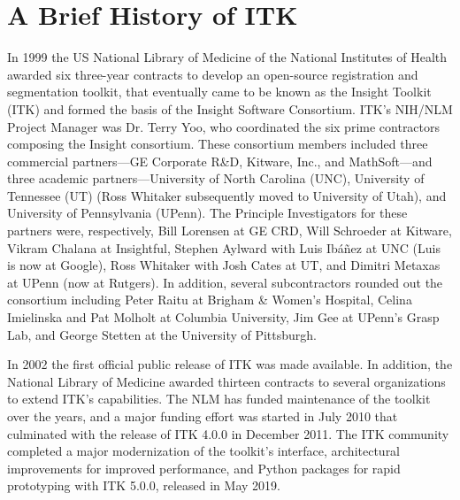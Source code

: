 \section{A Brief History of ITK}%
\label{sec:History}%
In 1999 the US National Library of Medicine of the National Institutes of
Health awarded six three-year contracts to develop an open-source
registration and segmentation toolkit, that eventually came to be known as
the Insight Toolkit (ITK) and formed the basis of the Insight Software
Consortium. ITK's NIH/NLM Project Manager was Dr. Terry Yoo, who coordinated the
six prime contractors composing the Insight consortium. These consortium
members included three commercial partners---GE Corporate R\&D, Kitware,
Inc., and MathSoft---and three academic
partners---University of North Carolina (UNC), University of Tennessee (UT)
(Ross Whitaker subsequently moved to University of Utah), and University of
Pennsylvania (UPenn). The Principle Investigators for these partners were,
respectively, Bill Lorensen at GE CRD, Will Schroeder at Kitware, Vikram
Chalana at Insightful, Stephen Aylward with Luis Ib\'{a}\~{n}ez at UNC (Luis
is now at Google), Ross Whitaker with Josh Cates at UT,
and Dimitri Metaxas at UPenn (now at Rutgers). In addition, several
subcontractors rounded out the consortium including Peter Raitu at Brigham \&
Women's Hospital, Celina Imielinska and Pat Molholt at Columbia University,
Jim Gee at UPenn's Grasp Lab, and George Stetten at the University of
Pittsburgh.

In 2002 the first official public release of ITK was made available. In
addition, the National Library of Medicine awarded thirteen contracts to
several organizations to extend ITK's capabilities. The NLM has funded
maintenance of the toolkit over the years, and a major funding effort was
started in July 2010 that culminated with the release of ITK 4.0.0 in December
2011. The ITK community completed a major modernization of the toolkit's
interface, architectural improvements for improved performance, and Python
packages for rapid prototyping with ITK 5.0.0, released in May 2019.
